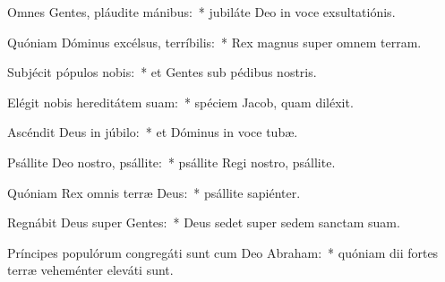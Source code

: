 \item Omnes Gentes, pláudite mánibus:~* jubiláte Deo in voce exsultatiónis.

\item Quóniam Dóminus excélsus, terríbilis:~* Rex magnus super omnem terram.

\item Subjécit pópulos nobis:~* et Gentes sub pédibus nostris.

\item Elégit nobis hereditátem suam:~* spéciem Jacob, quam diléxit.

\item Ascéndit Deus in júbilo:~* et Dóminus in voce tubæ.

\item Psállite Deo nostro, psállite:~* psállite Regi nostro, psállite.

\item Quóniam Rex omnis terræ Deus:~* psállite sapiénter.

\item Regnábit Deus super Gentes:~* Deus sedet super sedem sanctam suam.

\item Príncipes populórum congregáti sunt cum Deo Abraham:~* quóniam dii fortes terræ veheménter eleváti sunt.
